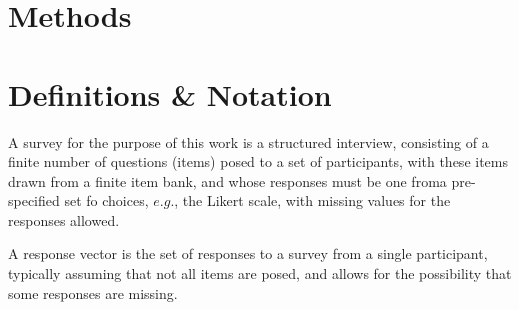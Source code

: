 \documentclass[onecolumn,10pt]{IEEEtran}
\begin{document}


\section*{Methods}

\section{Definitions \& Notation}

\begin{defn}[Survey]
  A survey for the purpose of this work is a structured interview, consisting of a finite number of questions (items) posed to a set of participants, with these items drawn from a finite item bank, and  whose responses must be one froma pre-specified set fo choices, $e.g.$, the Likert scale, with missing values for the responses allowed. 
\end{defn}


\begin{defn}
  A response vector is the set of responses to a survey from a single participant, typically assuming that not all items are posed, and allows for the possibility that some responses are missing.
\end{defn}
\end{document}
